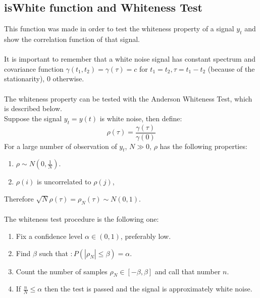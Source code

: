 \documentclass[10pt,a4paper,final]{article}
\begin{document}
\subsection{isWhite function and Whiteness Test}\label{sec:iswhite}
This function was made in order to test the whiteness property of a signal $y_t$ and show the correlation function of that signal.
\\ \\ 
It is important to remember that a white noise signal has constant spectrum and covariance function $\gamma(t_1,t_2)=\gamma(\tau)=c$ for $t_1 = t_2, \tau=t_1-t_2$ (because of the stationarity), $0$ otherwise.
\\ \\
The whiteness property can be tested with the Anderson Whiteness Test, which is described below.\\
Suppose the signal $y_t=y(t)$ is white noise, then define:
$$\rho(\tau) = \frac{\gamma(\tau)}{\gamma(0)}$$
For a large number of observation of $y_t$, $N \gg 0$, $\rho$ has the following properties:
\begin{enumerate}
\item $\rho \sim N(0, \frac{1}{N})$.
\item $\rho(i)$ is uncorrelated to $\rho(j)$, %
\end{enumerate}
Therefore $\sqrt{N}\rho(\tau) = \rho_N (\tau)\sim N(0,1)$.
\\ \\ 
The whiteness test procedure is the following one:
\begin{enumerate}
\item  Fix a confidence level $\alpha \in (0,1)$, preferably low.
\item Find $\beta$ such that $: P(|\rho_N| \leq \beta) = \alpha$.
\item Count the number of samples $\rho_N \in [-\beta, \beta]$ and call that number $n$.
\item If $\frac{n}{N} \leq \alpha$ then the test is passed and the signal is approximately white noise.
\end{enumerate}
\end{document}
